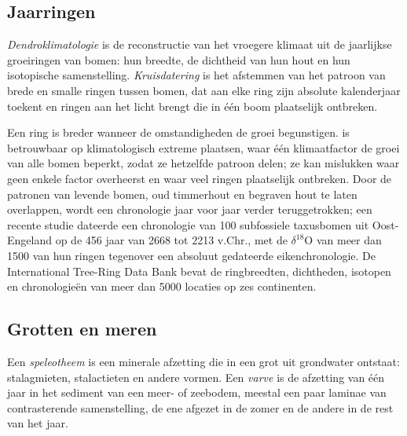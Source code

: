 \subsection*{Jaarringen}

\begin{definition}\label{def:b2:climate-proxies:dendro}
\emph{Dendroklimatologie} is de reconstructie van het vroegere klimaat uit de
jaarlijkse groeiringen van bomen: hun breedte, de dichtheid van hun hout en hun isotopische
samenstelling. \emph{Kruisdatering} is het afstemmen van het patroon van brede en
smalle ringen tussen bomen, dat aan elke ring zijn absolute kalenderjaar toekent en
ringen aan het licht brengt die in één boom plaatselijk ontbreken.
\end{definition}

Een ring is breder wanneer de omstandigheden de groei begunstigen.  is betrouwbaar op klimatologisch extreme plaatsen, waar één
klimaatfactor de groei van alle bomen beperkt, zodat ze hetzelfde patroon delen; ze kan
mislukken waar geen enkele factor overheerst en waar veel ringen plaatselijk ontbreken.
Door de patronen van levende bomen, oud timmerhout en begraven hout te laten overlappen, wordt een chronologie
jaar voor jaar verder teruggetrokken; een recente studie dateerde een chronologie van 100 subfossiele taxusbomen uit Oost-Engeland op de
456 jaar van 2668 tot 2213 v.Chr., met de $\delta^{18}$O van meer dan \num{1500} van hun ringen
tegenover een absoluut gedateerde eikenchronologie. De International Tree-Ring Data Bank bevat de
ringbreedten, dichtheden, isotopen en chronologieën van meer dan \num{5000} locaties op zes continenten.

\subsection*{Grotten en meren}

\begin{definition}\label{def:b2:climate-proxies:archives}
Een \emph{speleotheem} is een minerale afzetting die in een grot uit grondwater
ontstaat: stalagmieten, stalactieten en andere vormen. Een \emph{varve} is
de afzetting van één jaar in het sediment van een meer- of zeebodem, meestal een paar laminae van contrasterende
samenstelling, de ene afgezet in de zomer en de andere in de rest van het jaar.
\end{definition}

